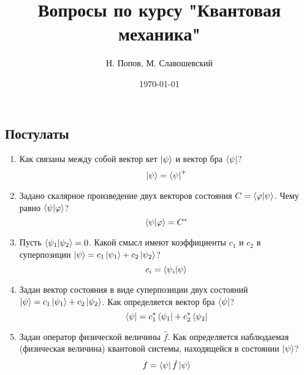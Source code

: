\documentclass{article}
\begin{document}
\title{Вопросы по курсу "Квантовая механика"}
\author{Н. Попов, М. Славошевский}
\date{\today}
\maketitle

{}

\subsection*{Постулаты}
	\begin{enumerate}
		\item {Как связаны между собой вектор кет $\ket{\psi}$ и вектор бра $\bra{\psi} $?}
		\begin{equation}
			\ket{\psi}=\bra{\psi}^{+}
		\end{equation}	
	\item {Задано скалярное произведение двух векторов состояния $C =\braket{\varphi | \psi}$. Чему равно $\braket{\psi | \varphi}$?}
	\begin{equation}
		\braket{\psi|\varphi}=C^{*}
	\end{equation}
	
	\item {Пусть $\braket{\psi_1 | \psi_2} = 0$. Какой смысл имеют коэффициенты $c_1$ и $c_2$ в суперпозиции $\ket{\psi} = c_1 \ket{\psi_1} + c_2 \ket{\psi_2} $?}
	\begin{equation}
		c_{i}=\braket{\psi_{i}|\psi}
	\end{equation}
	\item {Задан вектор состояния в виде суперпозиции двух состояний $\ket{\psi} = c_1 \ket{\psi_1} + c_2 \ket{\psi_2}$. Как
определяется вектор бра $\bra{\psi}$?}
	\begin{equation}
		\bra{\psi}=c_{1}^{*}\bra{\psi_{1}}+c_{2}^{*}\bra{\psi_{2}}
	\end{equation}
	\item {Задан оператор физической величины $\hat{f}$. Как определяется наблюдаемая (физическая величина) квантовой системы, находящейся в состоянии $\ket{\psi}$?
}	
	\begin{equation}
		f=\bra{\psi}\hat{f}\ket{\psi}
	\end{equation}
	
	\end{enumerate}
\end{document}
